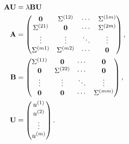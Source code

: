 \begin{align}
    \mathbf{A} \mathbf{U} &= \lambda \mathbf{B} \mathbf{U} \\
    \mathbf{A} &= \begin{pmatrix}
        \mathbf{0} & \Sigma^{(12)} & \cdots & \Sigma^{(1m)} \\
        \Sigma^{(21)} & \mathbf{0} & \cdots & \Sigma^{(2m)} \\
        \vdots & \vdots & \ddots & \vdots \\
        \Sigma^{(m1)} & \Sigma^{(m2)} & \cdots & \mathbf{0}
    \end{pmatrix}, \\
    \mathbf{B} &= \begin{pmatrix}
        \Sigma^{(11)} & \mathbf{0} & \cdots & \mathbf{0} \\
        \mathbf{0} & \Sigma^{(22)} & \cdots & \mathbf{0} \\
        \vdots & \vdots & \ddots & \vdots \\
        \mathbf{0} & \mathbf{0} & \cdots & \Sigma^{(mm)}
    \end{pmatrix}, \\
    \mathbf{U} &= \begin{pmatrix}
        u^{(1)} \\
        u^{(2)} \\
        \vdots \\
        u^{(m)}
    \end{pmatrix}.
\end{align}

